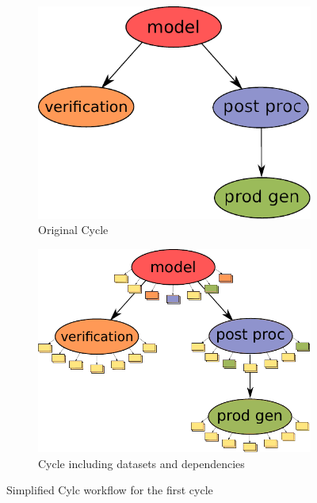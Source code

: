 \documentclass[a4paper]{article}
\begin{document}
\begin{figure}[H]
  \begin{subfigure}{0.45\textwidth}
    \centering
    \includegraphics[width=\columnwidth]{cycle1}
    \caption{Original Cycle}
    \label{fig:cycle1}
  \end{subfigure}
  \qquad
  \begin{subfigure}{0.45\textwidth}
    \centering
    \includegraphics[width=\columnwidth]{cycle-io-dep}
    \caption{Cycle including datasets and dependencies}
    \label{fig:cycle-io-dep}
  \end{subfigure}
  \caption{Simplified Cylc workflow for the first cycle}
\end{figure}
\end{document}
